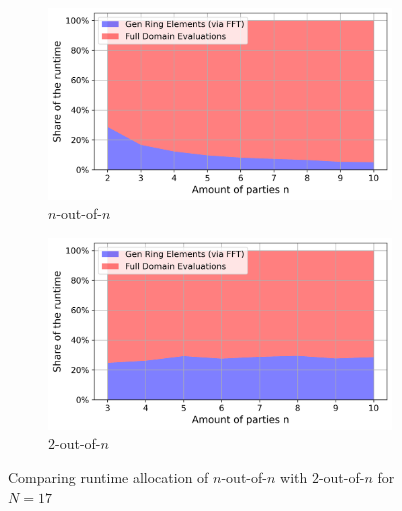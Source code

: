 \begin{figure}[t]
    \hspace{-1em}
    \begin{subfigure}[b]{0.5\textwidth}
        \centering
        \includegraphics[scale=0.49]{images/plots/bbs_noutofN_percentage_dist.png}
        \caption{$n$-out-of-$n$}
    \end{subfigure}
    \hspace{0em}
    \begin{subfigure}[b]{0.5\textwidth}
        \centering
        \includegraphics[scale=0.49]{images/plots/bbs_TAUoutofN_percentage_dist.png}
        \caption{$2$-out-of-$n$}
    \end{subfigure}
    \label{fig:runtimeAllocationComparision}
    \caption{Comparing runtime allocation of $n$-out-of-$n$ with $2$-out-of-$n$ for $N=17$}
\end{figure}
